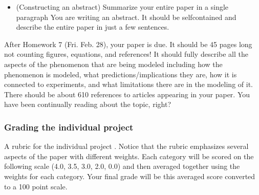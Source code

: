 \documentclass[letterpaper,10pt,english]{jupyterBook}
\begin{document}
\begin{itemize}
\item {} 
\sphinxAtStartPar
{} (Constructing an abstract) \sphinxhyphen{} Summarize your entire paper in a single paragraph \sphinxhyphen{} You are writing an abstract. It should be self\sphinxhyphen{}contained and describe the entire paper in just a few sentences.

\end{itemize}

\sphinxAtStartPar
After Homework 7 (Fri. Feb. 28), your paper is due. It should be 4\sphinxhyphen{}5 pages long not counting figures, equations, and references! It should fully describe all the aspects of the phenomenon that are being modeled including how the phenomenon is modeled, what predictions/implications they are, how it is connected to experiments, and what limitations there are in the modeling of it. There should be about 6\sphinxhyphen{}10 references to articles appearing in your paper. You have been continually reading about the topic, right?


\subsubsection{Grading the individual project}
\label{\detokenize{content/0_course/assessments:grading-the-individual-project}}
\sphinxAtStartPar
A rubric for the individual project . Notice that the rubric emphasizes several aspects of the paper with different weights. Each category will be scored on the following scale (4.0, 3.5, 3.0, 2.0, 0.0) and then averaged together using the weights for each category. Your final grade will be this averaged score converted to a 100 point scale.
\end{document}
